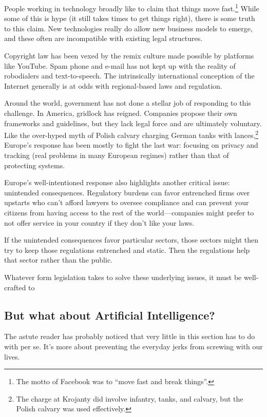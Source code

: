 People working in technology broadly like to claim that things move
fast.\footnote{The motto of Facebook was to ``move fast and break
  things''.}  While some of this is hype (it still takes times to get
things right), there is some truth to this claim.  New technologies
really do allow new business models to emerge, and these often are
incompatible with existing legal structures.

Copyright law has been vexed by the remix culture made possible by
platforms like YouTube.  Spam phone and e-mail has not kept up with
the reality of robodialers and text-to-speech.  The intrinsically
international conception of the Internet generally is at odds with
regional-based laws and regulation.

Around the world, government has not done a stellar job of responding
to this challenge.  In America, gridlock has reigned.  Companies
propose their own frameworks and guidelines, but they lack legal force
and are ultimately voluntary.  Like the over-hyped myth of Polish
calvary charging German tanks with lances,\footnote{The charge at
  Krojanty did involve infantry, tanks, and calvary, but the Polish
  calvary was used effectively.} Europe's response has been mostly to
fight the last war: focusing on privacy and tracking (real problems in
many European regimes) rather than that of protecting systems.

Europe's well-intentioned  response also highlights another
critical issue: unintended consequences.  Regulatory burdens can favor
entrenched firms over upstarts who can't afford lawyers to oversee
compliance and can prevent your citizens from having access to the
rest of the world---companies might prefer to not offer service in
your country if they don't like your laws.

If the unintended consequences favor particular sectors, those sectors
might then try to keep those regulations entrenched and static.  Then
the regulations help that sector rather than the public.

Whatever form legislation takes to solve these underlying issues, it must be well-crafted to 


\subsection{But what about Artificial Intelligence?}

The astute reader has probably noticed that very little in this
section has to do with  per se.  It's more about preventing
the everyday jerks from screwing with our lives.

